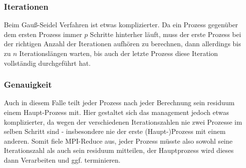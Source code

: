 \documentclass[11pt]{article} %
\begin{document}
\subsubsection{Iterationen}
Beim Gauß-Seidel Verfahren ist etwas komplizierter. Da ein Prozess gegenüber dem ersten Prozess immer $p$ Schritte hinterher läuft, muss der erste Prozess bei der richtigen Anzahl der Iterationen aufhören zu berechnen, dann allerdings bis zu $n$ Iterationslängen warten, bis auch der letzte Prozess diese Iteration vollständig durchgeführt hat.
\subsubsection{Genauigkeit}
Auch in diesem Falle teilt jeder Prozess nach jeder Berechnung sein residuum einem Haupt-Prozess mit. Hier gestaltet sich das management jedoch etwas komplizierter, da wegen der verschiedenen Iterationszahlen nie zwei Prozesse im  selben Schritt sind - insbesondere nie der erste (Haupt-)Prozess mit einem anderen. Somit fiele MPI-Reduce aus, jeder Prozess müsste also sowohl seine Iterationszahl als auch sein residuum mitteilen, der Hauptprozess wird dieses dann Verarbeiten und ggf. terminieren.
\end{document}
